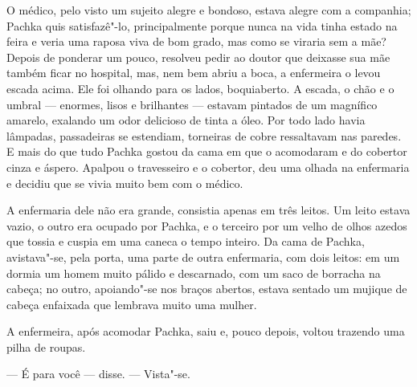 O médico, pelo visto um sujeito alegre e bondoso, estava alegre com a
companhia; Pachka quis satisfazê"-lo, principalmente porque nunca na vida
tinha estado na feira e veria uma raposa viva de bom grado, mas como se
viraria sem a mãe? Depois de ponderar um pouco, resolveu pedir ao doutor
que deixasse sua mãe também ficar no hospital, mas, nem bem abriu a
boca, a enfermeira o levou escada acima. Ele foi olhando para os lados,
boquiaberto. A escada, o chão e o umbral --- enormes, lisos e brilhantes
--- estavam pintados de um magnífico amarelo, exalando um odor delicioso
de tinta a óleo. Por todo lado havia lâmpadas, passadeiras se estendiam,
torneiras de cobre ressaltavam nas paredes. E mais do que tudo Pachka
gostou da cama em que o acomodaram e do cobertor cinza e áspero. Apalpou
o travesseiro e o cobertor, deu uma olhada na enfermaria e decidiu que
se vivia muito bem com o médico.

A enfermaria dele não era grande, consistia apenas em três leitos. Um
leito estava vazio, o outro era ocupado por Pachka, e o terceiro por um
velho de olhos azedos que tossia e cuspia em uma caneca o tempo inteiro.
Da cama de Pachka, avistava"-se, pela porta, uma parte de outra
enfermaria, com dois leitos: em um dormia um homem muito pálido e
descarnado, com um saco de borracha na cabeça; no outro, apoiando"-se nos
braços abertos, estava sentado um mujique de cabeça enfaixada que
lembrava muito uma mulher.

A enfermeira, após acomodar Pachka, saiu e, pouco depois, voltou
trazendo uma pilha de roupas.

--- É para você --- disse. --- Vista"-se.

